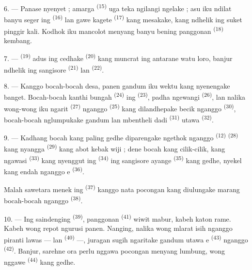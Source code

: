 6. --- Panase nyenyet ; amarga  \textsuperscript{(15)} uga
teka ngilangi ngelake ; asu iku ndilat banyu seger ing  \textsuperscript{(16)} lan gawe kagete 
\textsuperscript{(17)} kang mesakake, kang ndhelik ing suket pinggir
kali. Kodhok iku mancolot menyang banyu bening panggonan
 \textsuperscript{(18)} kembang.

7. ---  \textsuperscript{(19)} adus ing cedhake
 \textsuperscript{(20)} kang muncrat ing antarane
watu loro, banjur ndhelik ing sangisore 
\textsuperscript{(21)} lan 
\textsuperscript{(22)}.

\VUsaut{5.0mm}
\VUsaut{3.4mm}

8. --- Kanggo bocah-bocah desa, panen gandum iku wektu kang nyenengake
banget. Bocah-bocah kanthi bungah 
\textsuperscript{(24)} ing  \textsuperscript{(23)},
padha ngewangi  \textsuperscript{(26)}, lan nalika
wong-wong iku ngarit  \textsuperscript{(27)}
nganggo  \textsuperscript{(25)} kang dilandhepake becik
nganggo  \textsuperscript{(30)}, bocah-bocah
nglumpukake gandum lan mbentheli dadi 
\textsuperscript{(31)} utawa  \textsuperscript{(32)}.

9. --- Kadhang bocah kang paling gedhe diparengake ngethok nganggo
 \textsuperscript{(12)} 
\textsuperscript{(28)} kang nyangga  \textsuperscript{(29)}
kang abot kebak wiji ; dene bocah kang cilik-cilik, kang ngawasi
 \textsuperscript{(33)} kang nyenggut ing 
\textsuperscript{(34)} ing sangisore ayange 
\textsuperscript{(35)} kang gedhe, nyekel  kang endah
nganggo e \textsuperscript{(36)}.

Malah sawetara menek ing  \textsuperscript{(37)} kanggo
nata pocongan kang diulungake marang bocah-bocah nganggo
 \textsuperscript{(38)}.

10. --- Ing saindenging  \textsuperscript{(39)},
panggonan  \textsuperscript{(41)} wiwit mabur,
kabeh katon rame. Kabeh wong repot ngurusi panen. Nanging, nalika wong
mlarat isih nganggo piranti lawas —  lan
 \textsuperscript{(40)} —, juragan sugih ngaritake gandum
utawa e \textsuperscript{(43)} nganggo  \textsuperscript{(42)}. Banjur, sarehne ora perlu nggawa pocongan
menyang lumbung, wong nggawe 
\textsuperscript{(44)} kang gedhe.

